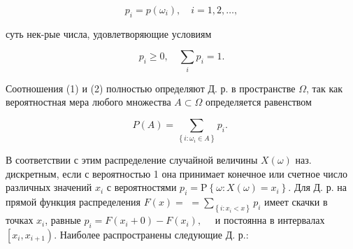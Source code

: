 \documentclass[10pt]{article}
\begin{document}
\[

p_{i}=p\left(\omega_{i}\right), \quad i=1,2, \ldots,

\]



суть нек-рые числа, удовлетворяющие условиям



\[

p_{i} \geqslant 0, \quad \sum_{i} p_{i}=1 .

\]



Соотношения (1) и (2) полностью определяют Д. р. в пространстве $\Omega$, так как вероятностная мера любого множества $A \subset \Omega$ определяется равенством



\[

P(A)=\sum_{\left\{i: \omega_{i} \in A\right\}} p_{i} \text {. }

\]



В соответствии с этим распределение случайной величины $X(\omega)$ наз. дискретным, если с вероятностью 1 она принимает конечное или счетное число различных значений $x_{i}$ с вероятностями $p_{i}=\mathrm{P}\left\{\omega: X(\omega)=x_{i}\right\}$. Для Д. р. на прямой функция распределения $F(x)=$ $=\sum_{\left\{i: x_{i}<x\right\}} p_{i}$ имеет скачки в точках $x_{i}$, равные $p_{i}=F\left(x_{i}+0\right)-F\left(x_{i}\right), \quad$ и постоянна в интервалах $\left[x_{i}, x_{i+1}\right)$. Наиболее распространены следующие Д. р.:
\end{document}
